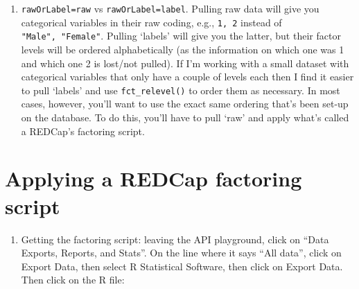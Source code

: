 \documentclass[
]{book}
\newenvironment{Shaded}{\begin{snugshade}}{\end{snugshade}}
\newcommand{\AttributeTok}[1]{\textcolor[rgb]{0.77,0.63,0.00}{#1}}
\newcommand{\CommentTok}[1]{\textcolor[rgb]{0.56,0.35,0.01}{\textit{#1}}}
\newcommand{\ConstantTok}[1]{\textcolor[rgb]{0.00,0.00,0.00}{#1}}
\newcommand{\FunctionTok}[1]{\textcolor[rgb]{0.00,0.00,0.00}{#1}}
\newcommand{\NormalTok}[1]{#1}
\newcommand{\OtherTok}[1]{\textcolor[rgb]{0.56,0.35,0.01}{#1}}
\newcommand{\SpecialCharTok}[1]{\textcolor[rgb]{0.00,0.00,0.00}{#1}}
\newcommand{\StringTok}[1]{\textcolor[rgb]{0.31,0.60,0.02}{#1}}
\providecommand{\tightlist}{%
  \setlength{\itemsep}{0pt}\setlength{\parskip}{0pt}}
\begin{document}
\begin{Shaded}
\end{Shaded}

\begin{enumerate}
\def\labelenumi{\arabic{enumi}.}
\setcounter{enumi}{4}
\tightlist
\item
  \texttt{rawOrLabel=\textquotesingle{}raw\textquotesingle{}} vs \texttt{rawOrLabel=\textquotesingle{}label\textquotesingle{}}. Pulling raw data will give you categorical variables in their raw coding, e.g., \texttt{1,\ 2} instead of \texttt{"Male",\ "Female"}. Pulling `labels' will give you the latter, but their factor levels will be ordered alphabetically (as the information on which one was 1 and which one 2 is lost/not pulled). If I'm working with a small dataset with categorical variables that only have a couple of levels each then I find it easier to pull `labels' and use \texttt{fct\_relevel()} to order them as necessary. In most cases, however, you'll want to use the exact same ordering that's been set-up on the database. To do this, you'll have to pull `raw' and apply what's called a REDCap's factoring script.
\end{enumerate}

\hypertarget{applying-a-redcap-factoring-script}{%
\section{Applying a REDCap factoring script}\label{applying-a-redcap-factoring-script}}

\begin{enumerate}
\def\labelenumi{\arabic{enumi}.}
\tightlist
\item
  Getting the factoring script: leaving the API playground, click on ``Data Exports, Reports, and Stats''. On the line where it says ``All data'', click on Export Data, then select R Statistical Software, then click on Export Data. Then click on the R file:
\end{enumerate}
\end{document}
